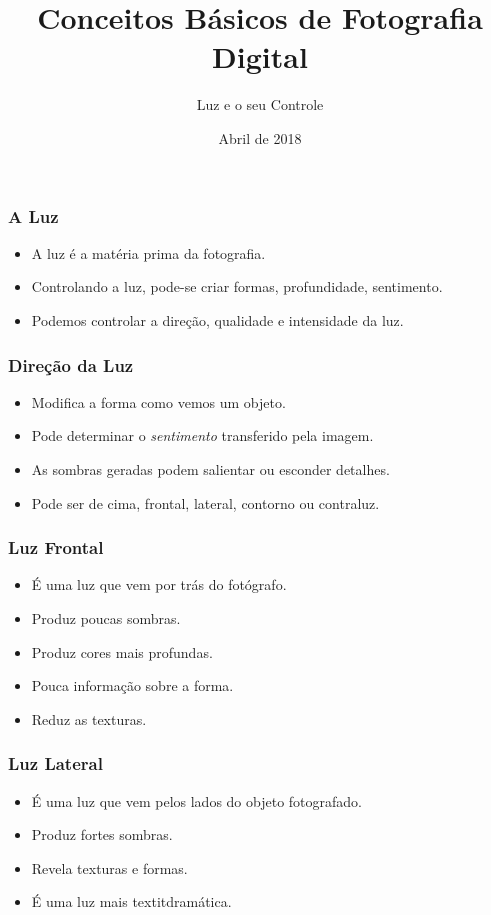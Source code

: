 


\title{Conceitos Básicos de Fotografia Digital}
\subtitle{Luz e o seu Controle}
\date{Abril de 2018}



\coverframe

\begin{frame}
    \frametitle{A Luz}
    \begin{itemize}
      \item A luz é a matéria prima da fotografia.
      \item Controlando a luz, pode-se criar formas, profundidade, sentimento.
      \item Podemos controlar a direção, qualidade e intensidade da luz.
    \end{itemize}
\end{frame}

\begin{frame}
    \frametitle{Direção da Luz}
    \begin{itemize}
      \item Modifica a forma como vemos um objeto.
      \item Pode determinar o \textit{sentimento} transferido pela imagem.
      \item As sombras geradas podem salientar ou esconder detalhes.
      \item Pode ser de cima, frontal, lateral, contorno ou contraluz.
    \end{itemize}
\end{frame}

\begin{frame}
  \frametitle{Luz Frontal}
  \begin{itemize}
    \item É uma luz que vem por trás do fotógrafo.
    \item Produz poucas sombras.
    \item Produz cores mais profundas.
    \item Pouca informação sobre a forma.
    \item Reduz as texturas.
  \end{itemize}
\end{frame}


\begin{frame}
  \frametitle{Luz Lateral}
  \begin{itemize}
    \item É uma luz que vem pelos lados do objeto fotografado.
    \item Produz fortes sombras.
    \item Revela texturas e formas.
    \item É uma luz mais textit{dramática}.
  \end{itemize}
\end{frame}

